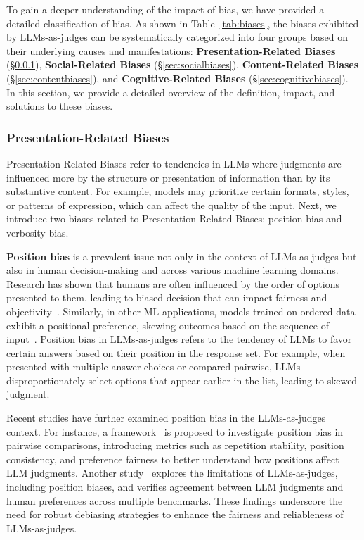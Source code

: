 To gain a deeper understanding of the impact of bias, we have provided a detailed classification of bias. As shown in Table~\ref{tab:biases}, the biases exhibited by LLMs-as-judges can be systematically categorized into four groups based on their underlying causes and manifestations: \textbf{Presentation-Related Biases} (\S\ref{sec:presentationbiases}), \textbf{Social-Related Biases} (\S\ref{sec:socialbiases}), \textbf{Content-Related Biases} (\S\ref{sec:contentbiases}), and \textbf{Cognitive-Related Biases} (\S\ref{sec:cognitivebiases}). In this section, we provide a detailed overview of the definition, impact, and solutions to these biases.









\subsubsection{Presentation-Related Biases}  
\label{sec:presentationbiases}
Presentation-Related Biases refer to tendencies in LLMs where judgments are influenced more by the structure or presentation of information than by its substantive content. 
For example, models may prioritize certain formats, styles, or patterns of expression, which can affect the quality of the input. Next, we introduce two biases related to Presentation-Related Biases: position bias and verbosity bias.



\noindent\textbf{Position bias} is a prevalent issue not only in the context of LLMs-as-judges but also in human decision-making and across various machine learning domains.
Research has shown that humans are often influenced by the order of options presented to them, leading to biased decision that can impact fairness and objectivity~\cite{shi2024judging,blunch1984position,raghubir2006center,zhao2024measuring}. 
Similarly, in other ML applications, models trained on ordered data exhibit a positional preference, skewing outcomes based on the sequence of input~\cite{ko2020look,wang2018position}. 
Position bias in LLMs-as-judges refers to the tendency of LLMs to favor certain answers based on their position in the response set. 
For example, when presented with multiple answer choices or compared pairwise, LLMs disproportionately select options that appear earlier in the list, leading to skewed judgment. 

Recent studies have further examined position bias in the LLMs-as-judges context. 
For instance, a framework~\cite{llmsjuding2024openreview} is proposed to investigate position bias in pairwise comparisons, introducing metrics such as repetition stability, position consistency, and preference fairness to better understand how positions affect LLM judgments. 
Another study~\cite{zheng2023judging} explores the limitations of LLMs-as-judges, including position biases, and verifies agreement between LLM judgments and human preferences across multiple benchmarks. 
These findings underscore the need for robust debiasing strategies to enhance the fairness and reliableness of LLMs-as-judges.

